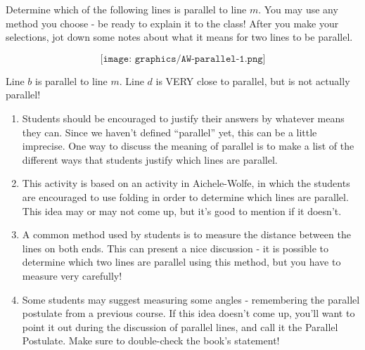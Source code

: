 \documentclass{ximera}
\begin{document}
\begin{problem}
Determine which of the following lines is parallel to line $m$.  You may use any method you choose - be ready to explain it to the class!  After you make your selections, jot down some notes about what it means for two lines to be parallel.

\vskip 1.5in
\[
\texttt{[image: graphics/AW-parallel-1.png]}
\]

\begin{solution}
    Line $b$ is parallel to line $m$.  Line $d$ is VERY close to parallel, but is not actually parallel!
\end{solution}

\begin{instructorNotes}
\begin{enumerate}
\item Students should be encouraged to justify their answers by whatever means they can.  Since we haven't defined ``parallel'' yet, this can be a little imprecise.  One way to discuss the meaning of parallel is to make a list of the different ways that students justify which lines are parallel.
\item This activity is based on an activity in Aichele-Wolfe, in which the students are encouraged to use folding in order to determine which lines are parallel.  This idea may or may not come up, but it's good to mention if it doesn't.
\item A common method used by students is to measure the distance between the lines on both ends.  This can present a nice discussion - it is possible to determine which two lines are parallel using this method, but you have to measure very carefully!
\item Some students may suggest measuring some angles - remembering the parallel postulate from a previous course.  If this idea doesn't come up, you'll want to point it out during the discussion of parallel lines, and call it the Parallel Postulate.  Make sure to double-check the book's statement!
\end{enumerate}
\end{instructorNotes}
\end{problem}
\end{document}
